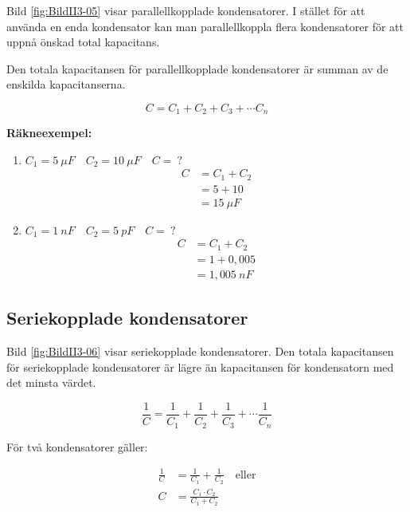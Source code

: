 
Bild \ref{fig:BildII3-05} visar parallellkopplade kondensatorer.
I stället för att använda en enda kondensator kan man parallellkoppla flera
kondensatorer för att uppnå önskad total kapacitans.

Den totala kapacitansen för parallellkopplade kondensatorer är summan av de
enskilda kapacitanserna.

\[C = C_1 + C_2 + C_3 + \cdots C_n\]

\begin{minipage}{\columnwidth}
\textbf{Räkneexempel:}
\begin{enumerate}
\item \(C_1 = 5\ \mu F \quad C_2 = 10\ \mu F \quad C =\ ?\)
  \begin{align*}
    C &= C_1 + C_2 \\
    &= 5 + 10 \\
    &= 15\ \mu F
  \end{align*}
\item \(C_1 = 1\ nF \quad C_2 = 5\ pF \quad C =\ ?\)
  \begin{align*}
    C &= C_1 + C_2 \\
    &= 1 + 0,005 \\
    &= 1,005\ nF
  \end{align*}
\end{enumerate}
\end{minipage}

\subsection{Seriekopplade kondensatorer}


Bild \ref{fig:BildII3-06} visar seriekopplade kondensatorer.
Den totala kapacitansen för seriekopplade kondensatorer är lägre än kapacitansen
för kondensatorn med det minsta värdet.

\[
\frac{1}{C} = \frac{1}{C_1} + \frac{1}{C_2} +
\frac{1}{C_3} + \cdots \frac{1}{C_n}
\]

För två kondensatorer gäller:

\begin{align*}
  \frac{1}{C} &= \frac{1}{C_1} + \frac{1}{C_2} \quad \text{eller} \\
  C &= \frac{C_1 \cdot C_2}{C_1 + C_2}
\end{align*}

